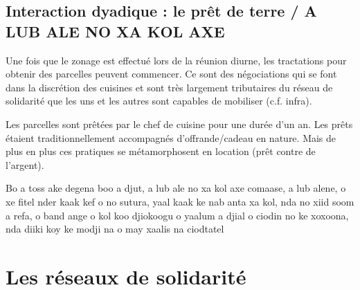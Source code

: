 \subsection{Interaction dyadique : le prêt de terre / A LUB ALE NO XA KOL AXE}

\begin{paracol}{2}
  Une fois que le zonage est effectué lors de la réunion diurne, les tractations pour obtenir des parcelles peuvent commencer. Ce sont des négociations qui se font dans la discrétion des cuisines et sont très largement tributaires du réseau de solidarité que les uns et les autres sont capables de mobiliser (c.f. infra).

  Les parcelles sont prêtées par le chef de cuisine pour une durée d'un an. Les prêts étaient traditionnellement accompagnés d'offrande/cadeau en nature. Mais de plus en plus ces pratiques se métamorphosent en location (prêt contre de l'argent).

  \switchcolumn %

  Bo a toss ake degena boo a djut, a lub ale no xa kol axe comaase, a lub alene, o xe fitel nder kaak kef o no sutura, yaal kaak ke nab anta xa kol, nda no xiid soom a refa, o band ange o kol koo djiokoogu o yaalum a djial o ciodin no ke xoxoona, nda diiki koy ke modji na o may xaalis na ciodtatel

\end{paracol}


\section{Les réseaux de solidarité}

%
%
%


